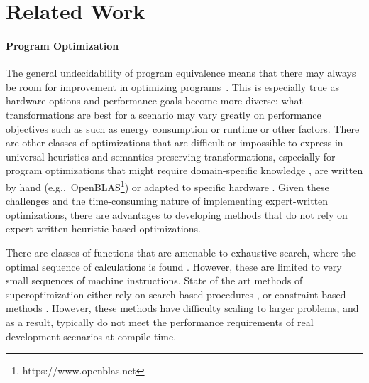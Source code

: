 \documentclass{article}
\begin{document}
\section{Related Work}


\paragraph{Program Optimization}

The general undecidability of program equivalence means that there may always be room for improvement in optimizing programs~\citep{rice1953}. This is especially true as hardware options and performance goals become more diverse: what transformations are best for a scenario may vary greatly on performance objectives such as such as energy consumption or runtime or other factors. There are other classes of optimizations that are difficult or impossible to express in universal heuristics and semantics-preserving transformations, especially for program optimizations that might require domain-specific knowledge \citep{rinard2006}, are written by hand (e.g.,~OpenBLAS\footnote{https://www.openblas.net}) or adapted to specific hardware \citep{fftw}. Given these challenges and the time-consuming nature of implementing expert-written optimizations, there are advantages to developing methods that do not rely on expert-written heuristic-based optimizations. 
 

There are classes of functions that are amenable to exhaustive search, where the optimal sequence of calculations is found \citep{massalin1987superoptimizer}. However, these are limited to very small sequences of machine instructions. State of the art methods of superoptimization either rely on search-based procedures \citep{schkufza2013stochastic}, or constraint-based methods \citep{sasnauskas2017}. However, these methods have difficulty scaling to larger problems, and as a result, typically do not meet the performance requirements of real development scenarios at compile time.
\end{document}
